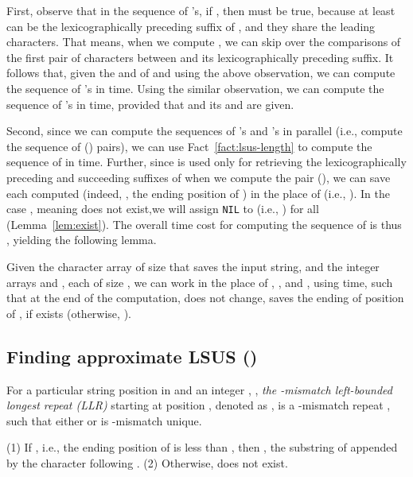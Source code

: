 \documentclass[11pt]{llncs}
\begin{document}
First, observe that in the sequence of 's, if , then  must be true, because at least  can be the lexicographically preceding suffix of ,
and they share the leading  characters.  That means, when we compute
, we can skip over the comparisons of the first  pair
of characters between  and its lexicographically
preceding suffix. It follows that, given the  and  of  and using the
above observation, we can compute the sequence of 's in 
time. 
Using the similar observation, we can compute the sequence of 's in
 time, provided that  and its  and  are given.

Second, since we can compute the sequences of 's and 's in
parallel (i.e., compute the sequence of () pairs), we can use
Fact~\ref{fact:lsus-length} to compute the sequence of  in
 time.  Further, since  is used only for retrieving
the lexicographically preceding and succeeding suffixes of 
when we compute the pair (), we can save each computed
 (indeed, , the ending position of
) in the place of  (i.e., ).  In the case
, meaning  does not exist,we will
assign {\tt NIL} to  (i.e., ) for all 
(Lemma~\ref{lem:exist}). The overall time cost for computing the
sequence of  is thus , yielding the following lemma.

\begin{lemma}
\label{lem:lsus-exact}
  Given the character array  of size  that saves the input string, 
  and the integer arrays  and , each of size , we can work
  in the place of , , and , using  time, such that at
  the end of the computation,  does not change,  saves the
  ending of position of , if  exists (otherwise,
  ).
\end{lemma}



\subsection{Finding approximate LSUS ()}
\label{sec:lsus-k}

\begin{definition}
\label{def:llr}
For a particular string position  in  
and an integer , , 
\emph{the -mismatch left-bounded longest repeat (LLR)}
starting at position , denoted as , is a -mismatch
repeat , 
such that either  or  is
-mismatch unique.   
\end{definition}

\begin{fact}
\label{fact:llr}
(1) If , i.e., the ending position of  is
less than , then , the substring of
 appended by the character following .
(2) Otherwise,  does not exist. 
\end{fact}
\end{document}
